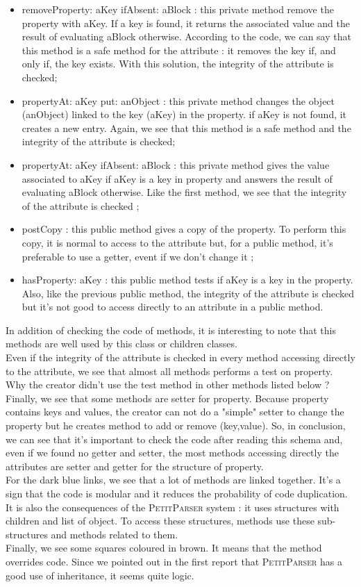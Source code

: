 \begin{itemize}
	\item removeProperty: aKey ifAbsent: aBlock : this private method	remove the property with aKey.  If a key is found, it returns the associated value and the result of evaluating aBlock otherwise.  According to the code, we can say that this method is a safe method for the attribute : it removes the key if, and only if, the key exists.  With this solution, the integrity of the attribute is checked;
	\item propertyAt: aKey put: anObject : this private method changes the object (anObject) linked to the key (aKey) in the property.  if aKey is not found, it creates a new entry.  Again, we see that this method is a safe method and the integrity of the attribute is checked;
	\item propertyAt: aKey ifAbsent: aBlock : this private method gives the value associated to aKey if aKey is a key in property and answers the result of evaluating aBlock otherwise.  Like the first method, we see that the integrity of the attribute is checked ;
	\item postCopy : this public method gives a copy of the property.  To perform this copy, it is normal to access to the attribute but, for a public method, it's preferable to use a getter, event if we don't change it ;
	\item hasProperty: aKey : this public method tests if aKey is a key in the property.  Also, like the previous public method, the integrity of the attribute is checked but it's not good to access directly to an attribute in a public method.
\end{itemize}
In addition of checking the code of methods, it is interesting to note that this methods are well used by this class or children classes.\\
Even if the integrity of the attribute is checked in every method accessing directly to the attribute, we see that almost all methods performs a test on property.  Why the creator didn't use the test method in other methods listed below ? \\
Finally, we see that some methods are setter for property.  Because property contains keys and values, the creator can not do a "simple" setter to change the property but he creates method to add or remove (key,value).  So, in conclusion, we can see that it's important to check the code after reading this schema and, even if we found no getter and setter, the most methods accessing directly the attributes are setter and getter for the structure of property.\\
For the dark blue links, we see that a lot of methods are linked together.  It's a sign that the code is modular and it reduces the probability of code duplication.  It is also the consequences of the \textsc{PetitParser} system : it uses structures with children and list of object.  To access these structures,  methods use these sub-structures and methods related to them.\\
Finally, we see some squares coloured in brown.  It means that the method overrides code. Since we pointed out in the first report that \textsc{PetitParser} has a good use of inheritance, it seems quite logic.
